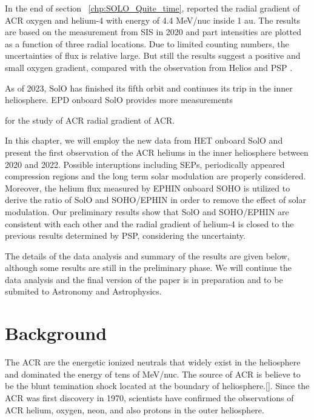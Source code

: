 In the end of section ~\ref{chp:SOLO_Quite_time}, \citet{Mason-2021-SolOQuietTime} reported the radial gradient of \ac{ACR} oxygen and helium-4 with energy of 4.4 MeV/nuc inside 1 au. The results are based on the measurement from \ac{SIS} in 2020 and part intensities are plotted as a function of three radial locations. Due to limited counting numbers, the uncertainties of flux is relative large. But still the results suggest a positive and small oxygen gradient, compared with the observation from Helios and \ac{PSP} \citep{Rankin2021ApJ,Marquardt2018AA}.

As of 2023, \ac{SolO} has finished its fifth orbit and continues its trip in the inner heliosphere. \ac{EPD} onboard \ac{SolO} provides more measurements 

for the study of \ac{ACR} radial gradient of \ac{ACR}. 

In this chapter, we will employ the new data from \ac{HET} onboard \ac{SolO} and present the first observation of the \ac{ACR} heliums in the inner heliosphere between 2020 and 2022. Possible interuptions including \acp{SEP}, periodically appeared compression regions and the long term solar modulation are properly considered. Moreover, the helium flux measured by \ac{EPHIN} onboard \ac{SOHO} is utilized to derive the ratio of \ac{SolO} and \ac{SOHO}/\ac{EPHIN} in order to remove the effect of solar modulation. Our preliminary results show that \ac{SolO} and \ac{SOHO}/\ac{EPHIN} are consistent with each other and the radial gradient of helium-4 is closed to the previous results determined by \ac{PSP}, considering the uncertainty.

The details of the data analysis and summary of the results are given below, although some results are still in the preliminary phase. We will continue the data analysis and the final version of the paper is in preparation and to be submited to Astronomy and Astrophysics.


\section{Background}

The \ac{ACR} are the energetic ionized neutrals that widely exist in the heliosphere and dominated the energy of tens of MeV/nuc. The source of \ac{ACR} is believe to be the blunt temination shock located at the boundary of heliosphere.[\citation]. Since the \ac{ACR} was first discovery in 1970, scientists have confirmed the observations of \ac{ACR} helium, oxygen, neon, and also protons in the outer heliosphere. 

